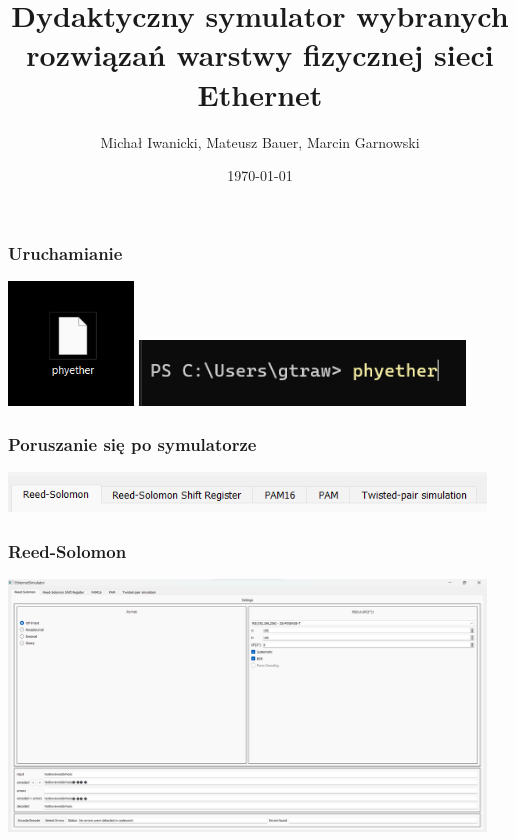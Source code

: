 \documentclass{beamer}
\title[Symulator phyether]{\textbf{Dydaktyczny symulator wybranych rozwiązań warstwy fizycznej sieci Ethernet}}
\author[Iwanicki M., Bauer M., Garnowski M.]{Michał Iwanicki, Mateusz Bauer, Marcin Garnowski}
\institute[PG]{Politechnika Gdańska}
\date{\today}
\begin{document}
\frame{\titlepage}

\begin{frame}
\frametitle{Uruchamianie}
\includegraphics[width=0.25\textwidth]{images/prezentacja_start1.png}
\hfill
\includegraphics[width=0.65\textwidth]{images/prezentacja_start2.png}
\end{frame}

\begin{frame}
\frametitle{Poruszanie się po symulatorze}
\includegraphics[width=0.95\textwidth]{images/zakladki.png}
\end{frame}

\begin{frame}
\frametitle{Reed-Solomon}
\includegraphics[width=0.95\textwidth]{images/prezentacja_rs.png}
\end{frame}
\end{document}
